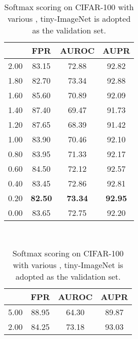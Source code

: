 \documentclass{article}
\begin{document}
\begin{table}[t]
\centering
\parbox{.30\linewidth}{
\centering
\scriptsize
\caption{Softmax scoring on CIFAR- with various , tiny-ImageNet is adopted as the validation set.} 
\vspace{5pt}
{
\begin{tabular}{c|ccc}
\toprule[1.5pt]
             & FPR     & AUROC       & AUPR      \\
\midrule[0.6pt]
2.00               & 83.15                  & 72.88                  & 92.82      \\
1.80               & 82.70                  & 73.34                  & 92.88      \\
1.60               & 85.60                  & 70.89                  & 92.09       \\
1.40               & 87.40                  & 69.47                  & 91.73      \\
1.20               & 87.65                  & 68.39                  & 91.42      \\
1.00               & 83.90                  & 70.46                  & 92.10 \\ 
0.80               & 83.95                  & 71.33                  & 92.17 \\
0.60               & 84.50                  & 72.12                  & 92.57 \\ 
0.40               & {83.45}                  & {72.86}                  & {92.81} \\
\cellcolor{greyC}0.20               & \cellcolor{greyC}\textbf{82.50}         & \cellcolor{greyC}\textbf{73.34}         & \cellcolor{greyC}\textbf{92.95} \\
0.00               & 83.65                       & 72.75                        & 92.20     \\ 
\bottomrule[1.5pt]      
\end{tabular}
}}~~
\parbox{.30\linewidth}{
\centering
\caption{Softmax scoring on CIFAR-100 with various , tiny-ImageNet is adopted as the validation set.} 
\scriptsize
\vspace{5pt}
{
\begin{tabular}{c|ccc}
\toprule[1.5pt]
            & FPR     & AUROC      & AUPR      \\
\midrule[0.6pt]
5.00               & 88.95                  & 64.30                  & 89.87       \\
2.00               & 84.25                  & 73.18                  & 93.03       \\

\end{tabular}}}
\end{table}
\end{document}
